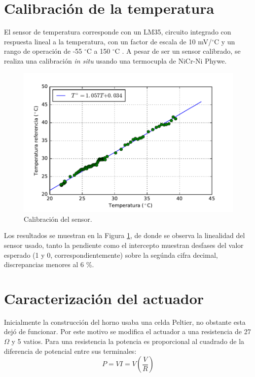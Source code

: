 \documentclass{wileysix}
\begin{document}
\section{Calibraci\'on de la temperatura}
El sensor de temperatura corresponde con un LM35, circuito integrado con respuesta lineal a la temperatura, con un factor de escala de 10 mV/$^\circ$C y un rango de operaci\'on de -55 $^\circ$C a 150 $^\circ$C \cite{LM35}. A pesar de ser un sensor calibrado, se realiza una calibraci\'on \textit{in situ} usando una termocupla de NiCr-Ni Phywe.
\begin{figure}[h]
	\centering
	\includegraphics[width=0.7\linewidth]{extras/temp_cal.pdf}
	\caption{Calibraci\'on del sensor.}
	\label{fig: temp calibration}
\end{figure}

Los resultados se muestran en la Figura \ref{fig: temp calibration}, de donde se observa la linealidad del sensor usado, tanto la pendiente como el intercepto muestran desfases del valor esperado (1 y 0, correspondientemente) sobre la seg\'unda cifra decimal, discrepancias menores al 6 \%.

\section{Caracterizaci\'on del actuador}
Inicialmente la construcci\'on del horno usaba una celda Peltier, no obstante esta dej\'o de funcionar. Por este motivo se modifica el actuador a una resistencia de 27 $\Omega$ y 5 vatios. Para una resistencia la potencia es proporcional al cuadrado de la diferencia de potencial entre sus terminales:
\begin{equation}
	P = VI = V\left(\frac{V}{R}\right)
\end{equation}
\end{document}
